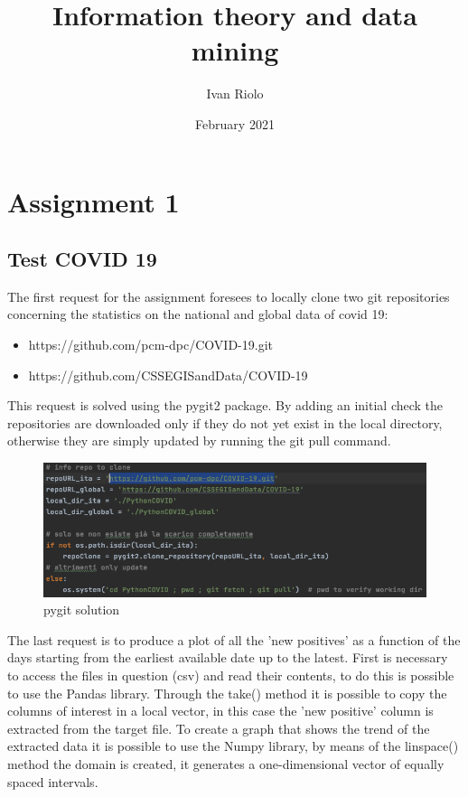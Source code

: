 \documentclass[12pt]{report}
\title{Information theory and data mining}
\author{Ivan Riolo }
\date{February 2021}
\begin{document}
\maketitle
\tableofcontents


\chapter{Assignment 1}
\section{Test COVID 19}
The first request for the assignment foresees to locally clone two git repositories concerning the statistics on the national and global data of covid 19:
\begin{itemize}
\item https://github.com/pcm-dpc/COVID-19.git
\item https://github.com/CSSEGISandData/COVID-19
\end{itemize}
This request is solved using the pygit2 package. By adding an initial check the repositories are downloaded only if they do not yet exist in the local directory, otherwise they are simply updated by running the git  pull command.
\begin{figure}[h!]
    \centering
    \includegraphics[width=14cm]{Pictures/covid1.png}
    \caption{pygit solution}
\end{figure}
The last request is to produce a plot of all the 'new positives' as a function of the days starting from the earliest available date up to the latest.
First is necessary to access the files in question (csv) and read their contents, to do this is possible to use the Pandas library. Through the take() method it is possible to copy the columns of interest in a local vector, in this case the 'new positive' column is extracted from the target file.
To create a graph that shows the trend of the extracted data it is possible to use the Numpy library, by means of the linspace() method the domain is created, it generates a one-dimensional vector of equally spaced intervals.
\end{document}
